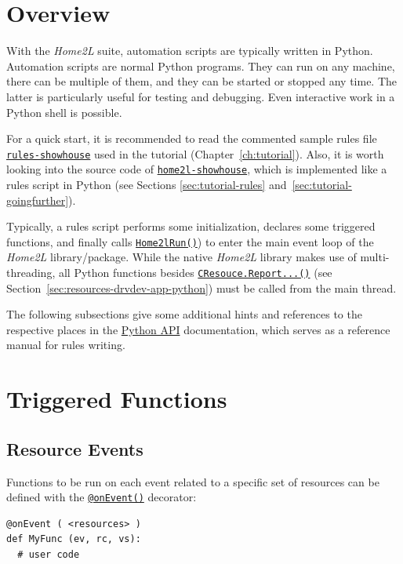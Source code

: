 \documentclass[12pt,english,parskip=half,headheight=19pt]{scrreprt}
\newcommand{\idx}[1]{#1\index{#1}}
\newcommand{\reftool}[1]{\hyperref[tool:#1]{\texttt{\idx{#1}}}}
\newcommand{\refdoc}[2]{\href{#1}{#2}}              %
\newcommand{\refapipython}[1]{\href{home2l-api_python/index.html}{\mbox{\texttt{#1}}}}  %
\newcommand{\theapipython}{\refdoc{home2l-api_python/index.html}{Python API}}
\begin{document}
\section{Overview}
\label{sec:rules-overview}

With the \textit{Home2L} suite, automation scripts are typically written in Python. Automation scripts are normal Python programs. They can run on any machine, there can be multiple of them, and they can be started or stopped any time. The latter is particularly useful for testing and debugging. Even interactive work in a Python shell is possible.

For a quick start, it is recommended to read the commented sample rules file \reftool{rules-showhouse} used in the tutorial (Chapter~\ref{ch:tutorial}). Also, it is worth looking into the source code of \reftool{home2l-showhouse}, which is implemented like a rules script in Python (see Sections \ref{sec:tutorial-rules} and~\ref{sec:tutorial-goingfurther}).

Typically, a rules script performs some initialization, declares some triggered functions, and finally calls \refapipython{Home2lRun()}) to enter the main event loop of the \textit{Home2L} library/package. While the native \textit{Home2L} library makes use of multi-threading, all Python functions besides \refapipython{CResouce.Report...()} (see Section~\ref{sec:resources-drvdev-app-python}) must be called from the main thread.

The following subsections give some additional hints and references to the respective places in the \theapipython{} documentation, which serves as a reference manual for rules writing.



\section{Triggered Functions}
\label{sec:rules-events}


\subsection{Resource Events}

Functions to be run on each event related to a specific set of resources can be defined with the \refapipython{@onEvent()} decorator:
\begin{lstlisting}
@onEvent ( <resources> )
def MyFunc (ev, rc, vs):
  # user code
\end{lstlisting}
\end{document}
